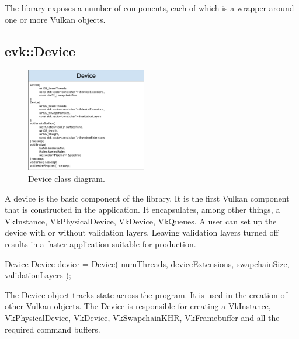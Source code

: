 \documentclass[12pt]{report}
\newcommand{\imagewidth}{0.47\textwidth}
\theoremstyle{definition}
\begin{document}
      The library exposes a number of components, each of which is a wrapper
      around one or more Vulkan objects.

      \subsection{evk::Device}

        \begin{figure}[h]
          \centering
          \includegraphics[width=\imagewidth]{images/class_device.png}
          \caption{Device class diagram.}
          \label{fig:class_device}  
        \end{figure}

        A device is the basic component of the library. It is the first Vulkan
        component that is constructed in the application. It encapsulates,
        among other things, a VkInstance, VkPhysicalDevice, VkDevice, VkQueues.
        A user can set up the device with or without validation layers. Leaving
        validation layers turned off results in a faster application suitable
        for production.

        \begin{usage}{Device}
  Device device = Device(
      numThreads, deviceExtensions, swapchainSize,
      validationLayers
  );
        \end{usage}

        The Device object tracks state across the program. It is used in the
        creation of other Vulkan objects. The Device is responsible for
        creating a VkInstance, VkPhysicalDevice, VkDevice, VkSwapchainKHR, VkFramebuffer
        and all the required command buffers. \\
\end{document}
